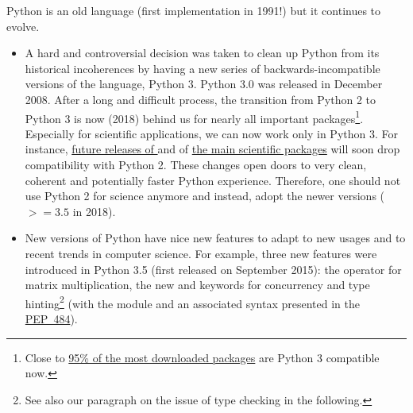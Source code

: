 Python is an old language (first implementation in 1991!) but it continues to
evolve.
\begin{itemize}
\item A hard and controversial decision was taken to clean up Python from its
historical incoherences by having a new series of backwards-incompatible
versions of the language, Python 3.  Python 3.0 was released in December 2008.
After a long and difficult process, the transition from Python 2 to Python 3 is
now (2018) behind us for nearly all important packages\footnote{Close to
\href{https://python3wos.appspot.com/}{95\% of the most downloaded packages}
are Python 3 compatible now.}.  Especially for scientific applications, we can
now work only in Python 3. For instance, \href{https://github.com/%
numpy/numpy/blob/master/doc/neps/dropping-python2.7-proposal.rst}{future
releases of \Numpy} and of \href{http://www.python3statement.org/}{the main
scientific packages} will soon drop compatibility with Python 2. These changes
open doors to very clean, coherent and potentially faster Python
experience. Therefore, one should not use Python 2 for science anymore and
instead, adopt the newer versions ($>=3.5$ in 2018).

\item New versions of Python have nice new features to adapt to new usages and to
recent trends in computer science.  For example, three new features were
introduced in Python 3.5 (first released on September 2015): the 
operator for matrix multiplication, the new  and
 keywords for concurrency and type hinting\footnote{See also our
paragraph on the issue of type checking in the following.} (with the module
 and an associated syntax presented in the
\href{https://www.python.org/dev/peps/pep-0484/}{PEP~484}).
\end{itemize}


